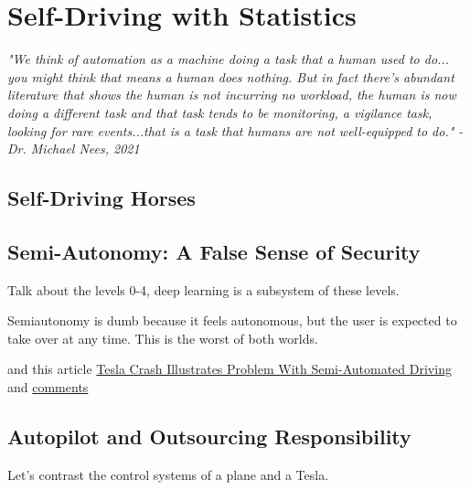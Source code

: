 \setchapterpreamble[u]{\margintoc}
\chapter{Self-Driving with Statistics}

\textit{"We think of automation as a machine doing a task that a human used to do... you might think that means a human does nothing. But in fact there’s abundant literature that shows the human is not incurring no workload, the human is now doing a different task and that task tends to be monitoring, a vigilance task, looking for rare events...that is a task that humans are not well-equipped to do." - Dr. Michael Nees, 2021}\cite{nees2021}

\section{Self-Driving Horses}

\section{Semi-Autonomy: A False Sense of Security}

Talk about the levels 0-4, deep learning is a subsystem of these levels.

Semiautonomy is dumb because it feels autonomous, but the user is expected to take over at any time. This is the worst of both worlds. \cite{torchinsky_boeckmann_2019}

and this article \href{https://www.theautopian.com/newly-released-video-of-thanksgiving-day-tesla-full-self-driving-crash-demonstrates-the-fundamental-problem-of-semi-automated-driving-systems/}{Tesla Crash Illustrates Problem With Semi-Automated Driving} and \href{https://news.ycombinator.com/item?id=34347778}{comments}

\section{Autopilot and Outsourcing Responsibility}

Let's contrast the control systems of a plane and a Tesla.

